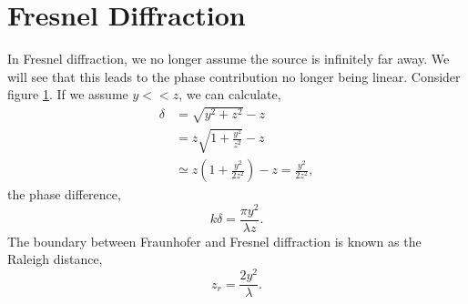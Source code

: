 \documentclass{book}
\begin{document}
{\section{Fresnel Diffraction}
\begin{figure}
	\centering
	\caption{}
	\label{fig:fresnel}
\end{figure}\noindent
In Fresnel diffraction, we no longer assume the source is infinitely far away. We will see that this leads to the phase contribution no longer being linear. Consider figure \ref{fig:fresnel}. If we assume $y << z$, we can calculate,
\begin{equation}
	\begin{split}
	\delta & = \sqrt{y^2 + z^2} - z \\
	& = z \sqrt{1 + \frac{y^2}{z^2}} - z \\
	& \simeq z\left(1 + \frac{y^2}{2z^2}\right) - z = \frac{y^2}{2z^2},
\end{split}
\end{equation}the phase difference,
\begin{equation}
	k\delta = \frac{\pi y^2}{\lambda z}.
\end{equation}
The boundary between Fraunhofer and Fresnel diffraction is known as the Raleigh distance,
\begin{equation}
	z_r = \frac{2y^2}{\lambda}.
\end{equation}
}
\end{document}
